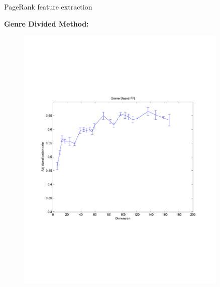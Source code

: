 \documentclass[xcolor=dvipsnames,t]{beamer} %
\begin{document}
\begin{frame}{PageRank feature extraction}

\textbf{Genre Divided Method:}
\vspace{-1in}
\begin{figure}
\centering
\includegraphics[width=0.9\textwidth]{figures/genrePR.pdf}
\end{figure}

\end{frame}

\end{document}
